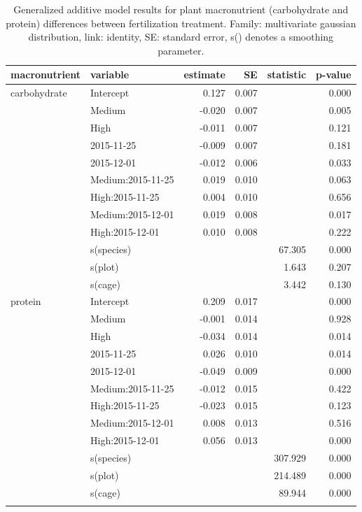 \documentclass[
]{article}
\begin{document}
\begin{longtable}{llrrrr}

\toprule
macronutrient & variable & estimate & SE & statistic & p-value \\ 
\midrule\addlinespace[2.5pt]
carbohydrate & Intercept & 0.127 & 0.007 &  & 0.000 \\ 
 & Medium & -0.020 & 0.007 &  & 0.005 \\ 
 & High & -0.011 & 0.007 &  & 0.121 \\ 
 & 2015-11-25 & -0.009 & 0.007 &  & 0.181 \\ 
 & 2015-12-01 & -0.012 & 0.006 &  & 0.033 \\ 
 & Medium:2015-11-25 & 0.019 & 0.010 &  & 0.063 \\ 
 & High:2015-11-25 & 0.004 & 0.010 &  & 0.656 \\ 
 & Medium:2015-12-01 & 0.019 & 0.008 &  & 0.017 \\ 
 & High:2015-12-01 & 0.010 & 0.008 &  & 0.222 \\ 
 & s(species) &  &  & 67.305 & 0.000 \\ 
 & s(plot) &  &  & 1.643 & 0.207 \\ 
 & s(cage) &  &  & 3.442 & 0.130 \\ 
protein & Intercept & 0.209 & 0.017 &  & 0.000 \\ 
 & Medium & -0.001 & 0.014 &  & 0.928 \\ 
 & High & -0.034 & 0.014 &  & 0.014 \\ 
 & 2015-11-25 & 0.026 & 0.010 &  & 0.014 \\ 
 & 2015-12-01 & -0.049 & 0.009 &  & 0.000 \\ 
 & Medium:2015-11-25 & -0.012 & 0.015 &  & 0.422 \\ 
 & High:2015-11-25 & -0.023 & 0.015 &  & 0.123 \\ 
 & Medium:2015-12-01 & 0.008 & 0.013 &  & 0.516 \\ 
 & High:2015-12-01 & 0.056 & 0.013 &  & 0.000 \\ 
 & s(species) &  &  & 307.929 & 0.000 \\ 
 & s(plot) &  &  & 214.489 & 0.000 \\ 
 & s(cage) &  &  & 89.944 & 0.000 \\ 
\bottomrule

\caption{\label{tbl-field-cage-plant-nutrients}Generalized additive
model results for plant macronutrient (carbohydrate and protein)
differences between fertilization treatment. Family: multivariate
gaussian distribution, link: identity, SE: standard error, s() denotes a
smoothing parameter.}

\tabularnewline

\end{longtable}
\end{document}
